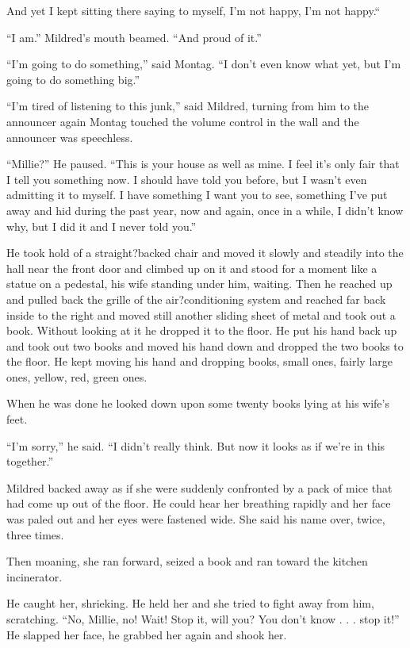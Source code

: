 \documentclass[11pt,openany]{book}
\begin{document}
And yet I kept sitting there saying to myself, I'm not happy, I'm not happy.``

``I am.'' Mildred's mouth beamed. ``And proud of it.''

``I'm going to do something,'' said Montag. ``I don't even know what yet, but I'm going to do something big.''

``I'm tired of listening to this junk,'' said Mildred, turning from him to the announcer again Montag touched the volume control in the wall and the announcer was speechless.

``Millie?'' He paused. ``This is your house as well as mine. I feel it's only fair that I tell you something now. I should have told you before, but I wasn't even admitting it to myself. I have something I want you to see, something I've put away and hid during the past year, now and again, once in a while, I didn't know why, but I did it and I never told you.''

He took hold of a straight?backed chair and moved it slowly and steadily into the hall near the front door and climbed up on it and stood for a moment like a statue on a pedestal, his wife standing under him, waiting. Then he reached up and pulled back the grille of the air?conditioning system and reached far back inside to the right and moved still another sliding sheet of metal and took out a book. Without looking at it he dropped it to the floor. He put his hand back up and took out two books and moved his hand down and dropped the two books to the floor. He kept moving his hand and dropping books, small ones, fairly large ones, yellow, red, green ones.

When he was done he looked down upon some twenty books lying at his wife's feet.

``I'm sorry,'' he said. ``I didn't really think. But now it looks as if we're in this together.''

Mildred backed away as if she were suddenly confronted by a pack of mice that had come up out of the floor. He could hear her breathing rapidly and her face was paled out and her eyes were fastened wide. She said his name over, twice, three times.

Then moaning, she ran forward, seized a book and ran toward the kitchen incinerator.

He caught her, shrieking. He held her and she tried to fight away from him, scratching. ``No, Millie, no! Wait! Stop it, will you? You don't know . . . stop it!'' He slapped her face, he grabbed her again and shook her.
\end{document}
